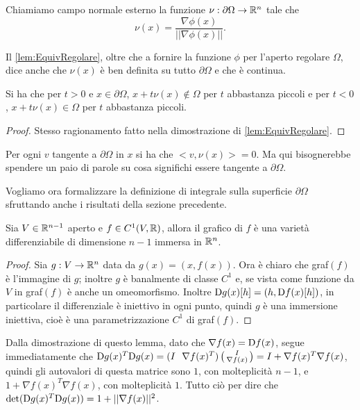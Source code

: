 \begin{definition}
	Chiamiamo campo normale esterno la funzione $\nu:\partial\Omega\rightarrow \mathbb R^n$ tale che
	\[
		\nu(x)=\frac{\nabla \phi(x)}{||\nabla \phi(x)||}.
	\]
\end{definition}

\begin{remark}
	Il \cref{lem:EquivRegolare}, oltre che a fornire la funzione $\phi$ per l'aperto regolare $\Omega$, dice anche che $\nu(x)$ è ben definita
	su tutto $\partial \Omega$ e che è continua.
\end{remark}

\begin{remark}
	Si ha che per $t>0$ e $x\in\partial\Omega$, $x+t\nu(x)\notin \Omega$ per $t$ abbastanza piccoli e per $t<0$, $x+t\nu(x)\in \Omega$ per $t$
	abbastanza piccoli.
\end{remark}
\begin{proof}
	Stesso ragionamento fatto nella dimostrazione di \cref{lem:EquivRegolare}.
\end{proof}

\begin{remark}
	Per ogni $v$ tangente a $\partial\Omega$ in $x$ si ha che $<v,\nu(x)>=0$. Ma qui bisognerebbe spendere un paio di parole su cosa significhi
	essere tangente a $\partial\Omega$.
\end{remark}


Vogliamo ora formalizzare la definizione di integrale sulla superficie $\partial\Omega$ sfruttando anche i risultati della sezione precedente.

\begin{lemma}\label{lem:GrapVar}
	Sia $V\in\mathbb R^{n-1}$ aperto e $f\in C^1(V,\mathbb R)$, allora il grafico di $f$ è una varietà differenziabile di dimensione $n-1$ immersa in $\mathbb R^n$.
\end{lemma}
\begin{proof}
	Sia $g:V\rightarrow \mathbb R^n$ data da $g(x)=(x,f(x))$. Ora è chiaro che graf$(f)$ è l'immagine di $g$; inoltre $g$ è banalmente di classe $C^1$
	e, se vista come funzione da $V$ in graf$(f)$ è anche un omeomorfismo. Inoltre $\mathrm D g(x)[h]=(h,\mathrm D f(x)[h])$, in particolare il differenziale è
	iniettivo in ogni punto, quindi $g$ è una immersione iniettiva, cioè è una parametrizzazione $C^1$ di graf$(f)$.
\end{proof}

\begin{remark}
	Dalla dimostrazione di questo lemma, dato che $\nabla f(x)=\mathrm D f(x)$, segue immediatamente che $\mathrm D g(x)^T \mathrm D g(x)=
	(I \ \ \nabla f(x)^T)
	\left(\begin{smallmatrix}
	I \\
	\nabla f(x)
	\end{smallmatrix}\right)=
	I+\nabla f(x)^T\nabla f(x)$, quindi gli autovalori di questa matrice sono $1$, con molteplicità $n-1$, e $1+\nabla f(x)^T\nabla f(x)$, con 
	molteplicità $1$. Tutto ciò per dire che $\det (\mathrm D g(x)^T \mathrm D g(x)) = 1+||\nabla f(x)||^2$. 
\end{remark}

